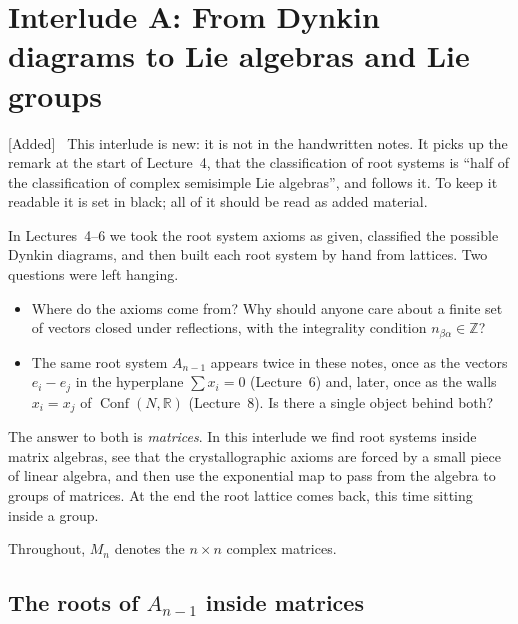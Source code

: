 \documentclass[11pt,openany]{book}
\theoremstyle{plain}
\theoremstyle{definition}
\theoremstyle{remark}
\newenvironment{addedblock}{\par\color{addcol}\noindent\textsf{\small[Added]}\ }{\par}
\newcommand{\R}{\mathbb{R}}
\newcommand{\Z}{\mathbb{Z}}
\newcommand{\Conf}{\operatorname{Conf}}
\begin{document}
\begingroup\renewcommand{\thechapter}{A}\renewcommand{\theHchapter}{interludeA}

\chapter[Interlude A: Lie algebras and Lie groups]{Interlude A: From Dynkin diagrams to Lie algebras and Lie groups}
\label{LIE:ch}

\begin{addedblock}
This interlude is new: it is not in the handwritten notes. It picks up the remark at the start of
Lecture~4, that the classification of root systems is ``half of the classification of complex
semisimple Lie algebras'', and follows it. To keep it readable it is set in black; all of it should be
read as added material.
\end{addedblock}

In Lectures~4--6 we took the root system axioms as given, classified the possible Dynkin diagrams, and
then built each root system by hand from lattices. Two questions were left hanging.
\begin{itemize}
\item Where do the axioms come from? Why should anyone care about a finite set of vectors closed under
  reflections, with the integrality condition $n_{\beta\alpha}\in\Z$?
\item The same root system $A_{n-1}$ appears twice in these notes, once as the vectors
  $e_i-e_j$ in the hyperplane $\sum x_i=0$ (Lecture~6) and, later, once as the walls $x_i=x_j$ of
  $\Conf(N,\R)$ (Lecture~8). Is there a single object behind both?
\end{itemize}
The answer to both is \emph{matrices}. In this interlude we find root systems inside matrix
algebras, see that the crystallographic axioms are forced by a small piece of linear algebra, and
then use the exponential map to pass from the algebra to groups of matrices. At the end the root
lattice comes back, this time sitting inside a group.

Throughout, $M_n$ denotes the $n\times n$ complex matrices.

\section{The roots of \texorpdfstring{$A_{n-1}$}{A(n-1)} inside matrices}
\label{LIE:sec:sln}
\end{document}
